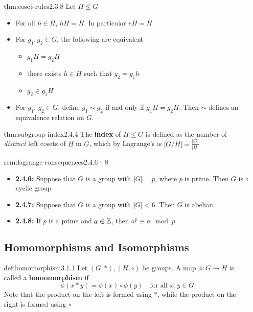 \documentclass[landscape, 8pt]{extarticle}
\begin{document}
\begin{multicols}{3}
\begin{thm}{thm:coset-rules}{2.3.8}
Let $H\le G$
\renewcommand\labelitemi{\tiny$\bullet$}
\begin{itemize}
    \setlength\itemsep{0em}
    \item For all $h\in H$, $hH = H$. In particular $eH = H$
    \item For $g_{1}, g_{2}\in G$, the following are equivalent
    \renewcommand\labelitemi{\tiny$\bullet$}
    \begin{itemize}
        \setlength\itemsep{0em}
        \item $g_{1}H = g_{2}H$
        \item there exists $h\in H$ such that $g_{2} = g_{1}h$
        \item $g_{2}\in g_{1}H$
    \end{itemize}
    \item For $g_{1},\,g_{2}\in G$, define $g_{1}\sim g_{2}$ if and only if $g_{1}H=g_{2}H$. Then $\sim$ defines an equivalence relation on $G$.
\end{itemize}
\end{thm}
\vspace{-5pt}

\begin{thm}{thm:subgroup-index}{2.4.4}
The \textbf{index} of $H\le G$ is defined as the number of \textit{distinct} left cosets of $H$ in $G$, which by Lagrange's is $\lvert G / H\rvert = \frac{\lvert G\rvert}{\lvert H\rvert }$
\end{thm}
\vspace{-5pt}

\begin{rem}{rem:lagrange-consequences}{2.4.6 - 8}
\renewcommand\labelitemi{\tiny$\bullet$}
\begin{itemize}
    \setlength\itemsep{0em}
    \item \textbf{2.4.6:} Suppose that $G$ is a group with $\lvert G \rvert=p$, where $p$ is prime. Then $G$ is a cyclic group
    \item \textbf{2.4.7:} Suppose that $G$ is a group with $\lvert G \rvert < 6$. Then $G$ is abelian
    \item \textbf{2.4.8:} If $p$ is a prime and $a\in \mathbb{Z}$, then $a^{p} \equiv a \mod{p}$
\end{itemize}
\end{rem}
\vspace{-5pt}

\subsection*{Homomorphisms and Isomorphisms}
\begin{dfn}{def:homomorphism}{3.1.1}
    Let $(G,*),(H,\circ)$ be groups. A map $\phi:G\to H$ is called a \textbf{homomorphism} if
    $$\phi(x*y)=\phi(x)\circ\phi(y)\quad \text{for all } x,y\in G$$
    Note that the product on the left is formed using $\ast$, while the product on the right is formed using $\circ$
\end{dfn}
\vspace{-5pt}


\end{multicols}
\end{document}
